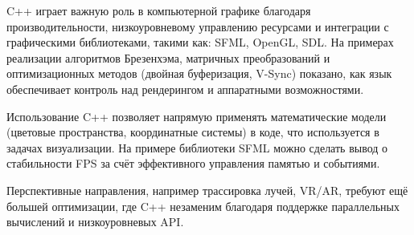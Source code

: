 C++ играет важную роль в компьютерной графике благодаря производительности, низкоуровневому управлению ресурсами и интеграции с графическими библиотеками, такими как: SFML, OpenGL, SDL. На примерах реализации алгоритмов Брезенхэма, матричных преобразований и оптимизационных методов (двойная буферизация, V-Sync) показано, как язык обеспечивает контроль над рендерингом и аппаратными возможностями.

Использование C++ позволяет напрямую применять математические модели (цветовые пространства, координатные системы) в коде, что используется в задачах визуализации. На примере библиотеки SFML можно сделать вывод о стабильности FPS за счёт эффективного управления памятью и событиями.

Перспективные направления, например трассировка лучей, VR/AR, требуют ещё большей оптимизации, где C++ незаменим благодаря поддержке параллельных вычислений и низкоуровневых API.